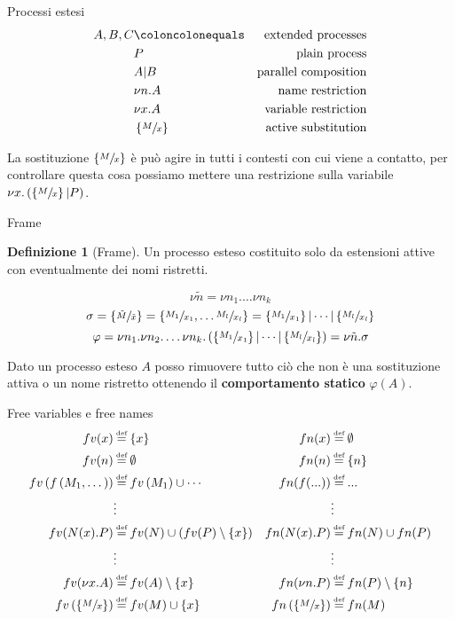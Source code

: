 \documentclass{beamer}
\newcounter{counter1}
\theoremstyle{plain}
\theoremstyle{definition}
\newtheorem{mydef}[counter1]{Definizione}
\theoremstyle{remark}
\newcommand{\set}[1]{\left\{#1\right\}}
\newcommand{\pa}[1]{\left(#1\right)}
\newcommand*{\eqdef}{\ensuremath{\overset{\mathclap{\text{\tiny def}}}{=}}}
\begin{document}
\begin{frame}{Processi estesi}
  \begin{align*}
    A,B,C & \coloncolonequals & \text{extended processes} \\
          & P & \text{plain process} \\
          & A | B & \text{parallel composition} \\
          & \nu n.A & \text{name restriction} \\
          & \nu x.A & \text{variable restriction} \\
          & \left\{ \sfrac{M}{x} \right\} & \text{active substitution}
  \end{align*}
  
  La sostituzione $\left\{ \sfrac{M}{x} \right\}$ \`e pu\`o agire in
  tutti i contesti con cui viene a contatto, per controllare questa cosa
  possiamo mettere una restrizione sulla variabile $\nu x.\left( \left\{
      \sfrac{M}{x} \right\} | P\right)$.
\end{frame}

\begin{frame}{Frame}
  \begin{mydef}[Frame]
    Un processo esteso costituito solo da estensioni attive con
    eventualmente dei nomi ristretti.
  \end{mydef}
  \[ \nu \tilde n = \nu n_1. \dots \nu n_k \]
  \[ \sigma = \set{ \sfrac{\tilde M}{\tilde x}} = \set{
      \sfrac{M_1}{x_1}, \dots \sfrac{M_l}{x_l}} = \set{
      \sfrac{M_1}{x_1}}| \cdots | \set{\sfrac{M_l}{x_l}} \]
  \[ \varphi = \nu n_1.\nu n_2.\dots \nu n_k . \pa{ \set{
        \sfrac{M_1}{x_1}}| \cdots | \set{\sfrac{M_l}{x_l}}} = \nu
    \tilde n. \sigma \]
  \vfill

  Dato un processo esteso $A$ posso rimuovere tutto ci\`o che non \`e
  una sostituzione attiva o un nome ristretto ottenendo il
  \textbf{comportamento statico} $\varphi(A)$.
\end{frame}

\begin{frame}{Free variables e free names}
  \begin{align*}
    fv(x) & \eqdef \set{x} & fn(x) & \eqdef \emptyset \\
    fv(n) & \eqdef \emptyset &  fn(n) & \eqdef \set{n} \\
    fv\pa{f\pa{ M_1, \dots }} & \eqdef fv\pa{M_1} \cup \cdots  & fn(f(...)) & \eqdef ... \\
          & \vdots & &\vdots  \\
    fv(N(x).P) & \eqdef fv(N) \cup \pa{fv(P) \setminus \set{x}} &   fn(N(x).P) & \eqdef fn(N) \cup fn(P) \\
          & \vdots & & \vdots \\
    fv(\nu x.A) & \eqdef fv(A) \setminus \set{x} &   fn(\nu n.P) & \eqdef fn(P)\setminus \set{n} \\
    fv\pa{ \set{ \sfrac{M}{x} } } & \eqdef fv(M) \cup \set{x} & fn\pa{ \set{ \sfrac{M}{x} } } & \eqdef fn(M) \\
  \end{align*}
\end{frame}
\end{document}
